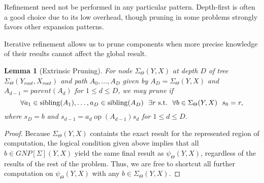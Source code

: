 \documentclass{article}
\newtheorem{lemma}{Lemma}
\newcommand{\GNP}[1][\psi]{{#1}_{\Theta}}
\DeclareMathOperator{\sibling}{sibling}
\DeclareMathOperator{\op}{op}
\newcommand{\st}{{\rm~s.t.~}}
\begin{document}
Refinement need not be performed in any particular pattern.
Depth-first is often a good choice due to its low overhead, though
pruning in some problems strongly favors other expansion patterns.


Iterative refinement allows us to prune components when more precise
knowledge of their results cannot affect the global result.
\begin{lemma}[Extrinsic Pruning]
  For node $\GNP[\Sigma](Y,X)$ at depth $D$ of tree
  $\GNP[\Sigma](Y_{root},X_{root})$ and path $A_0,\ldots,A_D$ given by
  $A_D = \GNP[\Sigma](Y,X)$ and $A_{d-1} = parent(A_{d})$ for $1 \leq
  d \leq D$, we may prune if
  \[
  \forall a_1 \in \sibling(A_1),\ldots,a_D \in \sibling(A_D)~~ \exists r \st~ \forall b \in \GNP[\Sigma](Y,X)~~ s_0 = r,
  \]
  where $s_D = b$ and $s_{d-1} = a_d \mathbin{\op(A_{d-1})} s_d$ for $1 \leq d
    \leq D$.
\end{lemma}
\begin{proof}
  Because $\GNP[\Sigma](Y,X)$ containts the exact result for the
  represented region of computation, the logical condition given above
  implies that all $b \in GNP[\Sigma](Y,X)$ yield the same final
  result as $\GNP(Y,X)$, regardless of the results of the rest of the
  problem.  Thus, we are free to shortcut all further computation on
  $\GNP(Y,X)$ with any $b \in \GNP[\Sigma](Y,X)$.
\end{proof}
\end{document}
